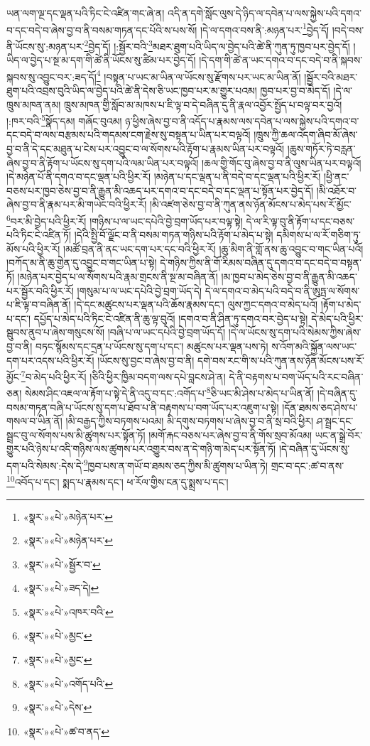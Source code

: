 ཡན་ལག་ལྔ་དང་ལྡན་པའི་ཏིང་ངེ་འཛིན་གང་ཞེ་ན། འདི་ན་དགེ་སློང་ལུས་དེ་ཉིད་ལ་དབེན་པ་ལས་སྐྱེས་པའི་དགའ་བ་དང་བདེ་བ་ཞེས་བྱ་བ་ནི་བསམ་གཏན་དང་པོའི་ས་པས་སོ། །དེ་ལ་དགའ་བས་ནི་:མཉན་པར་\footnote{«སྣར་»«པེ་»མཉེན་པར་}བྱེད་དོ། །བདེ་བས་ནི་ཡོངས་སུ་:མཉན་པར་\footnote{«སྣར་»«པེ་»མཉེན་པར་}བྱེད་དོ། །:སྦྱོར་བའི་\footnote{«སྣར་»«པེ་»སྦྱོར་བ་}མཐར་ཐུག་པའི་ཡིད་ལ་བྱེད་པའི་ཚེ་ནི་ཀུན་ཏུ་ཁྱབ་པར་བྱེད་དོ། །ཡིད་ལ་བྱེད་པ་སྔ་མ་དག་གི་ཚེ་ནི་ཡོངས་སུ་ཚིམ་པར་བྱེད་དོ། །དེ་དག་གི་ཚེ་ན་ཡང་དགའ་བ་དང་བདེ་བ་ནི་སྐབས་སྐབས་སུ་འབྱུང་བར་:ཟད་དོ།\footnote{«སྣར་»«པེ་»ཟད་དེ།} །བསྟན་པ་ཡང་མ་ཡིན་ལ་ཡོངས་སུ་རྫོགས་པར་ཡང་མ་ཡིན་ནོ། །སྦྱོར་བའི་མཐར་ཐུག་པའི་འབྲས་བུའི་ཡིད་ལ་བྱེད་པའི་ཚེ་ནི་དེས་ཅི་ཡང་ཁྱབ་པར་མ་གྱུར་པའམ། ཁྱབ་པར་བྱ་བ་མེད་དོ། །དེ་ལ་ཁྲུས་མཁན་ནམ། ཁྲུས་མཁན་གྱི་སློབ་མ་མཁས་པ་ཇི་ལྟ་བ་དེ་བཞིན་དུ་ནི་རྣལ་འབྱོར་སྤྱོད་པ་བལྟ་བར་བྱའོ། །:ཁར་བའི་\footnote{«སྣར་»«པེ་»འཁར་བའི་}སྣོད་དམ། གཞོང་བུའམ། ཉ་ཕྱིས་ཞེས་བྱ་བ་ནི་འདོད་པ་རྣམས་ལས་དབེན་པ་ལས་སྐྱེས་པའི་དགའ་བ་དང་བདེ་བ་ལས་བརྩམས་པའི་གདམས་ངག་རྗེས་སུ་བསྟན་པ་ཡིན་པར་བལྟའོ། །ཁྲུས་ཀྱི་ཆལ་འདག་ཞིབ་མོ་ཞེས་བྱ་བ་ནི་དེ་དང་མཐུན་པ་ངེས་པར་འབྱུང་བ་ལ་སོགས་པའི་རྟོག་པ་རྣམས་ཡིན་པར་བལྟའོ། །ཆུས་གཏོར་ཏེ་བརླན་ཞེས་བྱ་བ་ནི་རྟོག་པ་ཡོངས་སུ་དག་པའི་ལམ་ཡིན་པར་བལྟའོ། །ཆལ་གྱི་གོང་བུ་ཞེས་བྱ་བ་ནི་ལུས་ཡིན་པར་བལྟའོ། །དེ་མཉེན་པོ་ནི་དགའ་བ་དང་ལྡན་པའི་ཕྱིར་རོ། །མཉེན་པ་དང་ལྡན་པ་ནི་བདེ་བ་དང་ལྡན་པའི་ཕྱིར་རོ། །ཕྱི་ནང་བཅས་པར་ཁྱབ་ཅེས་བྱ་བ་ནི་རྒྱུན་མི་འཆད་པར་དགའ་བ་དང་བདེ་བ་དང་ལྡན་པ་སྟོན་པར་བྱེད་དོ། །མི་འཐོར་བ་ཞེས་བྱ་བ་ནི་རྣམ་པར་མི་གཡེང་བའི་ཕྱིར་རོ། །མི་འཛག་ཅེས་བྱ་བ་ནི་ཀུན་ནས་ཉོན་མོངས་པ་མེད་པས་རོ་མྱོང་\footnote{«སྣར་»«པེ་»མྱང་}བར་མི་བྱེད་པའི་ཕྱིར་རོ། །གཉིས་པ་ལ་ཡང་དཔེའི་བྱེ་བྲག་ཡོད་པར་བལྟ་སྟེ། དེ་ལ་རི་ལྟ་བུ་ནི་རྟོག་པ་དང་བཅས་པའི་ཏིང་ངེ་འཛིན་ཏོ། །དེའི་སྤྱི་བོ་ལྗོང་བ་ནི་བསམ་གཏན་གཉིས་པའི་རྟོག་པ་མེད་པ་སྟེ། དམིགས་པ་ལ་རོ་གཅིག་ཏུ་མོས་པའི་ཕྱིར་རོ། །མཚོ་བྲན་ནི་ནང་ཡང་དག་པར་དང་བའི་ཕྱིར་རོ། །ཆུ་མིག་ནི་གློ་ནས་ཆུ་འབྱུང་བ་གང་ཡིན་པའོ། །བཀོད་མ་ནི་ཆུ་གྱེན་དུ་འབྱུང་བ་གང་ཡིན་པ་སྟེ། དེ་གཉིས་ཀྱིས་ནི་གོ་རིམས་བཞིན་དུ་དགའ་བ་དང་བདེ་བ་བསྟན་ཏོ། །མཉེན་པར་བྱེད་པ་ལ་སོགས་པའི་རྣམ་གྲངས་ནི་སྔ་མ་བཞིན་ནོ། །མ་ཁྱབ་པ་མེད་ཅེས་བྱ་བ་ནི་རྒྱུན་མི་འཆད་པར་སྦྱོར་བའི་ཕྱིར་རོ། །གསུམ་པ་ལ་ཡང་དཔེའི་བྱེ་བྲག་ཡོད་དེ། དེ་ལ་དགའ་བ་མེད་པའི་བདེ་བ་ནི་ཨུཏྤ་ལ་སོགས་པ་ཇི་ལྟ་བ་བཞིན་ནོ། །དེ་དང་མཚུངས་པར་ལྡན་པའི་ཆོས་རྣམས་དང་། ལུས་ཀྱང་དགའ་བ་མེད་པའོ། །རྟོག་པ་མེད་པ་དང་། དཔྱོད་པ་མེད་པའི་ཏིང་ངེ་འཛིན་ནི་ཆུ་ལྟ་བུའོ། །དགའ་བ་ནི་ཤིན་ཏུ་དགའ་བར་བྱེད་པ་སྟེ། དེ་མེད་པའི་ཕྱིར་སྦུབས་ནུབ་པ་ཞེས་གསུངས་སོ། །བཞི་པ་ལ་ཡང་དཔེའི་བྱེ་བྲག་ཡོད་དོ། །དེ་ལ་ཡོངས་སུ་དག་པའི་སེམས་ཀྱིས་ཞེས་བྱ་བ་ནི། བཏང་སྙོམས་དང་དྲན་པ་ཡོངས་སུ་དག་པ་དང་། མཚུངས་པར་ལྡན་པས་ཏེ། ས་འོག་མའི་སྐྱོན་ལས་ཡང་དག་པར་འདས་པའི་ཕྱིར་རོ། །ཡོངས་སུ་བྱང་བ་ཞེས་བྱ་བ་ནི། དགེ་བས་རང་གི་ས་པའི་ཀུན་ནས་ཉོན་མོངས་པས་རོ་མྱོང་\footnote{«སྣར་»«པེ་»མྱང་}བ་མེད་པའི་ཕྱིར་རོ། །ཅིའི་ཕྱིར་ཁྱིམ་བདག་ལས་དཔེ་བླངས་ཤེ་ན། དེ་ནི་བརྟགས་པ་བག་ཡོད་པའི་རང་བཞིན་ཅན། སེམས་ཤིང་འཇལ་ལ་རྟོག་པ་སྟེ་དེ་ནི་འདུ་བ་དང་:འགོད་པ་\footnote{«སྣར་»«པེ་»འགོད་པའི་}ཅི་ཡང་མི་ཤེས་པ་མེད་པ་ཡིན་ནོ། །དེ་བཞིན་དུ་བསམ་གཏན་བཞི་པ་ཡོངས་སུ་དག་པ་ཐོབ་པ་ནི་བརྟགས་པ་བག་ཡོད་པར་འཇུག་པ་སྟེ། །དོན་ཐམས་ཅད་ཤེས་པ་གསལ་བ་ཡིན་ནོ། །མི་བརྒྱད་ཀྱིས་བཏགས་པའམ། མི་དགུས་བཏགས་པ་ཞེས་བྱ་བ་ནི་སྲ་བའི་ཕྱིར། ཤ་སྦྲང་དང་སྦྲང་བུ་ལ་སོགས་པས་མི་ཚུགས་པར་སྟོན་ཏོ། །མགོ་རྐང་བཅས་པར་ཞེས་བྱ་བ་ནི་གོས་སྲབ་མོའམ། ཡང་ན་སྒྲེ་བོར་གྱུར་པའི་ཉེས་པ་འདི་གཉིས་ལས་ཚུགས་པར་འགྱུར་བས་ན་དེ་གཉི་ག་མེད་པར་སྟོན་ཏོ། །དེ་བཞིན་དུ་ཡོངས་སུ་དག་པའི་སེམས་:དེས་དེ་\footnote{«སྣར་»«པེ་»དེས་}ཁྱབ་པས་ན་གཡོ་བ་ཐམས་ཅད་ཀྱིས་མི་ཚུགས་པ་ཡིན་ཏེ། གྲང་བ་དང་:ཚ་བ་ནས་\footnote{«སྣར་»«པེ་»ཚ་བ་ནད་}འབོད་པ་དང་། སྨད་པ་རྣམས་དང་། ཕ་རོལ་གྱིས་ངན་དུ་སྨྲས་པ་དང་། 